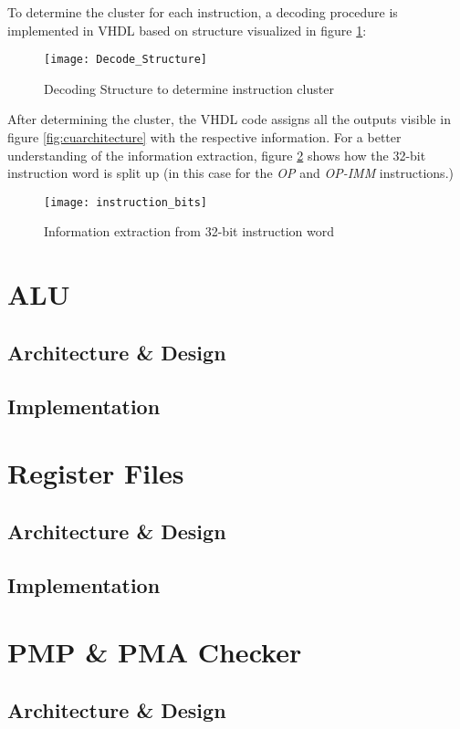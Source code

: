 To determine the cluster for each instruction, a decoding procedure is implemented in VHDL based on structure visualized in figure \ref{fig:decode_structure}:

\begin{figure}[H]
	\centering
	\texttt{[image: Decode\_Structure]}
	\caption{Decoding Structure to determine instruction cluster}
	\label{fig:decode_structure}
\end{figure}
After determining the cluster, the VHDL code assigns all the outputs visible in figure \ref{fig:cuarchitecture} with the respective information. For a better understanding of the information extraction, figure \ref{fig:instruction_bits} shows how the 32-bit instruction word is split up (in this case for the \textit{OP} and \textit{OP-IMM} instructions.)
\begin{figure}[H]
	\centering
	\texttt{[image: instruction\_bits]}
	\caption{Information extraction from 32-bit instruction word}
	\label{fig:instruction_bits}
\end{figure}

\section{ALU}
\subsection{Architecture \& Design}
\subsection{Implementation}

\section{Register Files}
\subsection{Architecture \& Design}
\subsection{Implementation}

\section{PMP \& PMA Checker}
\subsection{Architecture \& Design}
